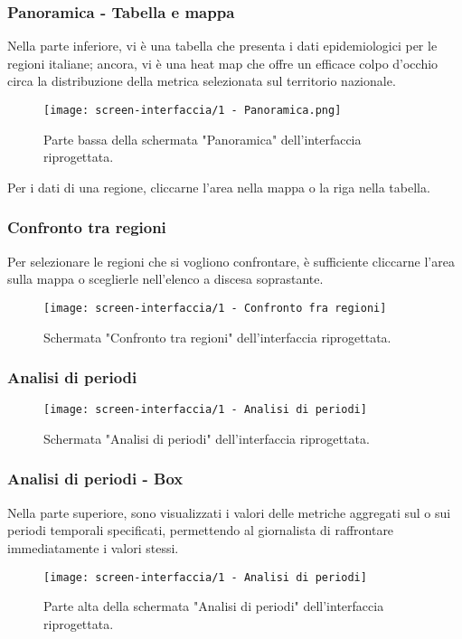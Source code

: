 \documentclass[../../main.tex]{subfiles}
\begin{document}
\begin{frame}
    \frametitle{Panoramica - Tabella e mappa}
    Nella parte inferiore, vi è una tabella che presenta i dati epidemiologici per le regioni italiane; ancora, vi è una heat map che offre un efficace colpo d'occhio circa la distribuzione della metrica selezionata sul territorio nazionale. 
    \begin{figure}
        \centering
        \texttt{[image: screen-interfaccia/1 - Panoramica.png]}
        \caption{Parte bassa della schermata "Panoramica" dell'interfaccia riprogettata.}
    \end{figure}
    \vspace{-10pt}
    Per i dati di una regione, cliccarne l'area nella mappa o la riga nella tabella.

\end{frame}

\begin{frame}
    \frametitle{Confronto tra regioni}
    \label{confronto-regioni}
    Per selezionare le regioni che si vogliono confrontare, è sufficiente cliccarne l'area sulla mappa o sceglierle nell'elenco a discesa soprastante.
    \begin{figure}
        \centering
        \texttt{[image: screen-interfaccia/1 - Confronto fra regioni]}
        \caption{Schermata "Confronto tra regioni" dell'interfaccia riprogettata.}
    \end{figure}    

\end{frame}


\begin{frame}
    \frametitle{Analisi di periodi}
    \label{analisi-periodi}
    \begin{figure}
        \centering
        \texttt{[image: screen-interfaccia/1 - Analisi di periodi]}
        \caption{Schermata "Analisi di periodi" dell'interfaccia riprogettata.}
    \end{figure}    

\end{frame}

\begin{frame}
    \frametitle{Analisi di periodi - Box}
    Nella parte superiore, sono visualizzati i valori delle metriche aggregati sul o sui periodi temporali specificati, permettendo al giornalista di raffrontare immediatamente i valori stessi.
    \begin{figure}
        \centering
        \texttt{[image: screen-interfaccia/1 - Analisi di periodi]}
        \caption{Parte alta della schermata "Analisi di periodi" dell'interfaccia riprogettata.}
    \end{figure}    

\end{frame}
\end{document}
